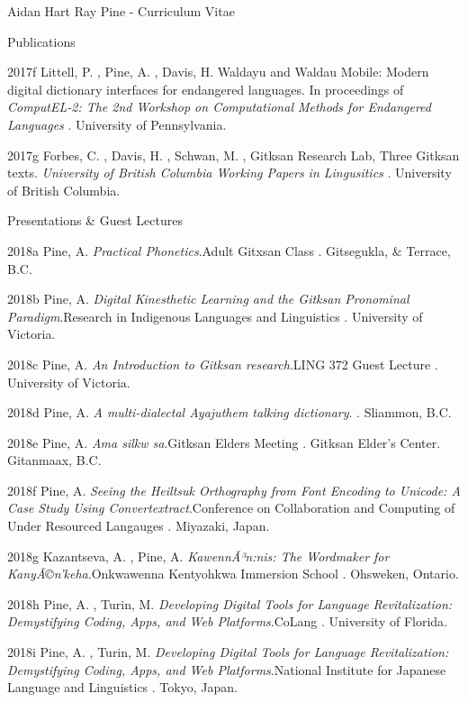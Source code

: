 \documentclass[12pt]{letter}
\begin{document}
\begin{cv}{ Aidan Hart Ray Pine  \space - \space   Curriculum Vitae}
\begin{cvlist}{Publications}
                                                            \item[2017f]  Littell,  P. ,  Pine,  A. ,  Davis,  H.   Waldayu and Waldau Mobile: Modern digital dictionary interfaces for endangered languages. In proceedings of \textit{ ComputEL-2: The 2nd Workshop on Computational Methods for Endangered Languages }. University of Pennsylvania.  
                                                            \item[2017g]  Forbes,  C. ,  Davis,  H. ,  Schwan,  M. ,  Gitksan Research Lab,    Three Gitksan texts. \textit{ University of British Columbia Working Papers in Lingusitics }. University of British Columbia.  
                                \end{cvlist}

        \begin{cvlist}{Presentations \& Guest Lectures}
                    \item[2018a]  Pine,  A.   \textit{Practical Phonetics}.Adult Gitxsan Class . Gitsegukla, \& Terrace, B.C.  
                    \item[2018b]  Pine,  A.   \textit{Digital Kinesthetic Learning and the Gitksan Pronominal Paradigm}.Research in Indigenous Languages and Linguistics . University of Victoria.  
                    \item[2018c]  Pine,  A.   \textit{An Introduction to Gitksan research}.LING 372 Guest Lecture . University of Victoria.  
                    \item[2018d]  Pine,  A.   \textit{A multi-dialectal Ayajuthem talking dictionary}. . Sliammon, B.C.  
                    \item[2018e]  Pine,  A.   \textit{Ama silkw sa}.Gitksan Elders Meeting . Gitksan Elder's Center. Gitanmaax, B.C.  
                    \item[2018f]  Pine,  A.   \textit{Seeing the Heiltsuk Orthography from Font Encoding to Unicode: A Case Study Using Convertextract}.Conference on Collaboration and Computing of Under Resourced Langauges . Miyazaki, Japan.  
                    \item[2018g]  Kazantseva,  A. ,  Pine,  A.   \textit{KawennÃ³n:nis: The Wordmaker for KanyÃ©n'keha}.Onkwawenna Kentyohkwa Immersion School . Ohsweken, Ontario.  
                    \item[2018h]  Pine,  A. ,  Turin,  M.   \textit{Developing Digital Tools for Language Revitalization: Demystifying Coding, Apps, and Web Platforms}.CoLang . University of Florida.  
                    \item[2018i]  Pine,  A. ,  Turin,  M.   \textit{Developing Digital Tools for Language Revitalization: Demystifying Coding, Apps, and Web Platforms}.National Institute for Japanese Language and Linguistics . Tokyo, Japan.  

\end{cvlist}
\end{cv}
\end{document}
